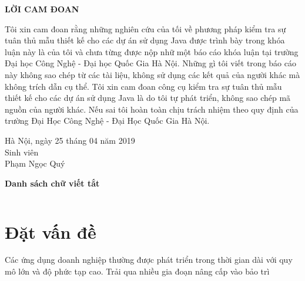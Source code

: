 \documentclass[12pt]{report}
\begin{document}
\newpage
\begin{center}
	\textbf{\large LỜI CAM ĐOAN}
\end{center}
Tôi xin cam đoan rằng những nghiên cứu của tối về phương pháp kiểm tra sự tuân thủ mẫu thiết kế cho các dự án sử dụng Java được trình bày trong khóa luận này là của tôi và chưa từng được nộp nhữ một báo cáo khóa luận tại trường Đại học Công Nghệ - Đại học Quốc Gia Hà Nội. Những gì tôi viết trong báo cáo này không sao chép từ các tài liệu, không sử dụng các kết quả của người khác mà không trích dẫn cụ thể. Tôi xin cam đoan công cụ kiểm tra sự tuân thủ mẫu thiết kế cho các dự án sử dụng Java là do tôi tự phát triển, không sao chép mã nguồn của người khác. Nếu sai tôi hoàn toàn chịu trách nhiệm theo quy định của trường Đại Học Công Nghệ - Đại Học Quốc Gia Hà Nội.


\begin{flushright}
	\begin{varwidth}{\linewidth}\centering
		Hà Nội, ngày 25 tháng 04 năm 2019\\
		Sinh viên\\[2cm]
		Phạm Ngọc Quý
	\end{varwidth}
\end{flushright}

\newpage
\tableofcontents

\newpage
{}
\listoftables

\newpage
{}
\begin{flushleft}
\bfseries{\Huge{Danh sách chữ viết tắt}}
\end{flushleft}
\begin{table}[h]
	\centering
	\begin{tabular}{lll}
	
	\end{tabular}
\end{table}

\newpage
{}
\listoffigures

\newpage
{}
\setcounter{page}{1}
\chapter{Đặt vấn đề}
\label{chap:intro}
Các ứng dụng doanh nghiệp thường được phát triển trong thời gian dài với quy mô lớn và độ phức tạp cao. Trải qua nhiều gia đoạn nâng cấp vào bảo trì
\end{document}
